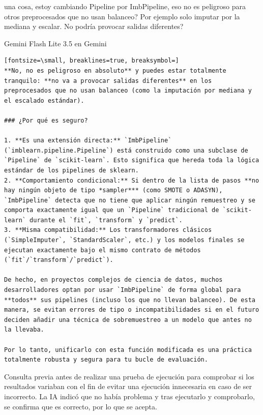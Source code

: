 \documentclass[12pt,a4paper,oneside]{book}
\begin{document}
\begin{iaprompt}
una cosa, estoy cambiando Pipeline por ImbPipeline, eso no es peligroso para otros preprocesados que no usan balanceo? Por ejemplo solo imputar por la mediana y escalar. No podría provocar salidas diferentes?
\end{iaprompt}
\begin{iaresp}{Gemini Flash Lite 3.5 en Gemini}
\begin{Verbatim}[fontsize=\small, breaklines=true, breaksymbol=]
**No, no es peligroso en absoluto** y puedes estar totalmente tranquilo: **no va a provocar salidas diferentes** en los preprocesados que no usan balanceo (como la imputación por mediana y el escalado estándar).

### ¿Por qué es seguro?

1. **Es una extensión directa:** `ImbPipeline` (`imblearn.pipeline.Pipeline`) está construido como una subclase de `Pipeline` de `scikit-learn`. Esto significa que hereda toda la lógica estándar de los pipelines de sklearn.
2. **Comportamiento condicional:** Si dentro de la lista de pasos **no hay ningún objeto de tipo *sampler*** (como SMOTE o ADASYN), `ImbPipeline` detecta que no tiene que aplicar ningún remuestreo y se comporta exactamente igual que un `Pipeline` tradicional de `scikit-learn` durante el `fit`, `transform` y `predict`.
3. **Misma compatibilidad:** Los transformadores clásicos (`SimpleImputer`, `StandardScaler`, etc.) y los modelos finales se ejecutan exactamente bajo el mismo contrato de métodos (`fit`/`transform`/`predict`).

De hecho, en proyectos complejos de ciencia de datos, muchos desarrolladores optan por usar `ImbPipeline` de forma global para **todos** sus pipelines (incluso los que no llevan balanceo). De esta manera, se evitan errores de tipo o incompatibilidades si en el futuro deciden añadir una técnica de sobremuestreo a un modelo que antes no la llevaba.

Por lo tanto, unificarlo con esta función modificada es una práctica totalmente robusta y segura para tu bucle de evaluación.
\end{Verbatim}
\end{iaresp}
\begin{iaanalisis}
Consulta previa antes de realizar una prueba de ejecución para comprobar si los resultados variaban con el fin de evitar una ejecución innecesaria en caso de ser incorrecto. La IA indicó que no había problema y tras ejecutarlo y comprobarlo, se confirma que es correcto, por lo que se acepta.
\end{iaanalisis}
\end{document}
